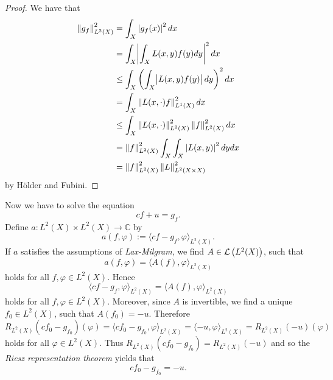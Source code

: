 \begin{enumerate}[label = \textbf{Exercise \arabic*.},wide = 0pt, itemsep = 1.5ex]
		\begin{proof}
			We have that
			\begin{align*}
				\norm[0]{g_f}_{L^2(X)}^2 &= \int_X \abs[0]{g_f(x)}^2 dx\\
				&= \int_X \abs[3]{\int_X L(x,y)f(y)dy}^2 dx\\
				&\leq \int_X \del[3]{\int_X \abs{L(x,y)f(y)}dy}^2 dx\\
				&= \int_X \norm[0]{L(x,\cdot)f}_{L^1(X)}^2 dx\\
			&\leq \int_X \norm[0]{L(x,\cdot)}_{L^2(X)}^2 \norm[0]{f}_{L^2(X)}^2 dx\\
			&= \norm[0]{f}_{L^2(X)}^2 \int_X \int_X \abs[0]{L(x,y)}^2dy dx\\
			&= \norm[0]{f}_{L^2(X)}^2 \norm[0]{L}_{L^2(X \times X)}^2
			\end{align*}
		\noindent by H\"older and Fubini.
		\end{proof}
		Now we have to solve the equation
		\begin{equation*}
			cf + u = g_f.
		\end{equation*}
		Define $a : L^2(X) \times L^2(X) \to \mathbb{C}$ by
		\begin{equation*}
			a(f,\varphi) := \langle cf - g_f, \varphi \rangle_{L^2(X)}.
		\end{equation*}
		If $a$ satisfies the assumptions of \emph{Lax-Milgram}, we find $A \in \mathcal{L}\del[1]{L^2(X)}$, such that 
		\begin{equation*}
			a(f,\varphi) = \langle A(f),\varphi \rangle_{L^2(X)}
		\end{equation*}
		\noindent holds for all $f,\varphi \in L^2(X)$. Hence
		\begin{equation*}
			  \langle cf - g_f, \varphi \rangle_{L^2(X)} = \langle A(f),\varphi \rangle_{L^2(X)}
		\end{equation*}
		\noindent holds for all $f,\varphi \in L^2(X)$. Moreover, since $A$ is invertible, we find a unique $f_0 \in L^2(X)$, such that $A(f_0) = -u$. Therefore
		\begin{equation*}
			R_{L^2(X)}(cf_0 - g_{f_0})(\varphi) = \langle cf_0 - g_{f_0}, \varphi \rangle_{L^2(X)} = \langle -u,\varphi \rangle_{L^2(X)} = R_{L^2(X)}(-u)(\varphi)
		\end{equation*}
		\noindent holds for all $\varphi \in L^2(X)$. Thus $R_{L^2(X)}(cf_0 - g_{f_0}) = R_{L^2(X)}(-u)$ and so the \emph{Riesz representation theorem} yields that
		\begin{equation*}
			cf_0 - g_{f_0} = -u.
		\end{equation*}


\end{enumerate}
